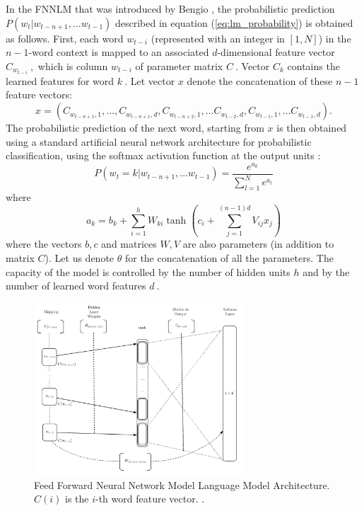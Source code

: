 
In the \ac{FNNLM} that was introduced by Bengio
\cite{Bengio:2003:NPL:944919.944966},  the probabilistic prediction $P(w_t | w_{t-n+1}, \ldots w_{t-1})$ described
in equation (\ref{eq:lm_probability}) is obtained as follows. First, each word $w_{t-i}$ (represented
with an integer in $[1,N]$) in the  $n-1$-word context is mapped
to an associated $d$-dimensional feature vector $C_{w_{t-i}}\ ,$ which is
column $w_{t-i}$ of parameter matrix $C\ .$ Vector $C_k$
contains the learned features for word $k\ .$
Let vector $x$ denote the concatenation of these $n-1$
feature vectors:
\begin{equation}
  x = (C_{w_{t-n+1},1}, \ldots, C_{w_{t-n+1},d}, C_{w_{t-n+2},1}, \ldots C_{w_{t-2},d}, C_{w_{t-1},1}, \ldots C_{w_{t-1},d}).
\end{equation}
The probabilistic prediction of the next word, starting from $x$
is then obtained using a standard artificial neural network architecture
for probabilistic classification, using the softmax activation function at the output units \cite{Bishop:1995:NNP:525960}:
\begin{equation}
 P(w_t=k | w_{t-n+1}, \ldots w_{t-1}) = \frac{e^{a_k}}{\sum_{l=1}^N e^{a_l}}
\end{equation}
where
\begin{equation}
 a_k = b_k + \sum_{i=1}^h W_{ki} \tanh(c_i + \sum_{j=1}^{(n-1)d} V_{ij} x_j)
\end{equation}
where the vectors $b,c$ and matrices $W,V$ are also
parameters (in addition to matrix $C$). Let us denote
$\theta$ for the concatenation of all the parameters.
The capacity of the model is controlled by the number of hidden units $h$
and by the number of learned word features $d\ .$ 


\begin{figure}[h]
    \centering
    \includegraphics[width=0.7\textwidth]{images/bengio-nnlm.pdf}
    \caption{Feed Forward Neural Network Model Language Model Architecture.
       $C(i)$ is the $i$-th word feature vector.  \cite{Bengio:2003:NPL:944919.944966}.}
    \label{fig:NNLM_architecture}
\end{figure}

